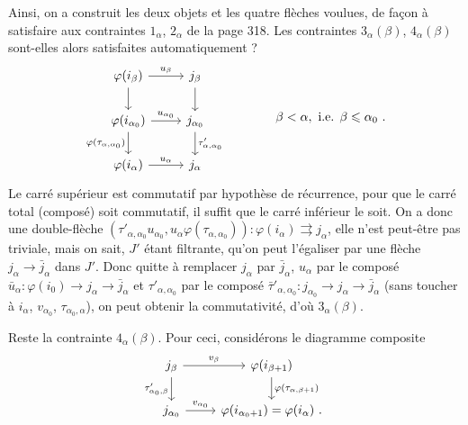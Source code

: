 \documentclass[11pt]{article}
\newcommand{\msp}[1]{\marginpar{\footnotesize [#1]}}
\begin{document}
Ainsi, on a construit les deux objets et les quatre flèches voulues, de façon à satisfaire aux contraintes $1_\alpha$, $2_\alpha$ de la page 318. Les contraintes $3_\alpha(\beta)$, $4_\alpha(\beta)$ sont-elles alors satisfaites automatiquement ?
\[
\begin{tikzcd}
\varphi(i_\beta) \arrow[r, "u_\beta"] \arrow[d] & j_\beta \arrow[d] \\
\varphi(i_{\alpha_0}) \arrow[r, "u_{\alpha_0}"] \arrow[d, "\varphi(\tau_{\alpha,\alpha_0})"'] & j_{\alpha_0} \arrow[d, "\tau'_{\alpha,\alpha_0}"] \\
\varphi(i_\alpha) \arrow[r, "u_\alpha"] & j_\alpha
\end{tikzcd}
\qquad\qquad \beta<\alpha, \text{ i.e. } \beta\leqslant\alpha_0\ .
\]
Le carré supérieur est commutatif par hypothèse de récurrence, pour que le carré total (composé) soit commutatif, il suffit que le carré inférieur le soit. On a donc une double-flèche $(\tau'_{\alpha,\alpha_0}u_{\alpha_0},u_\alpha\varphi(\tau_{\alpha,\alpha_0})):\varphi(i_\alpha)\rightrightarrows j_\alpha$, elle n'est peut-être pas triviale, mais on sait, $J'$ étant filtrante, qu'on peut l'égaliser par une flèche $j_\alpha\longrightarrow\bar{j}_\alpha$ dans $J'$. Donc quitte à remplacer $j_\alpha$ par %
\msp{page 324}
$\bar{j}_\alpha$, $u_\alpha$ par le composé $\bar{u}_\alpha:\varphi(i_0)\longrightarrow j_\alpha\longrightarrow\bar{j}_\alpha$ et $\tau'_{\alpha,\alpha_0}$ par le composé $\bar{\tau}'_{\alpha,\alpha_0}:j_{\alpha_0}\longrightarrow j_\alpha\longrightarrow\bar{j}_\alpha$ (sans toucher à $i_\alpha$, $v_{\alpha_0}$, $\tau_{\alpha_0,\alpha}$), on peut obtenir la commutativité, d'où $3_\alpha(\beta)$. %

Reste la contrainte $4_\alpha(\beta)$. Pour ceci, considérons le diagramme composite
\[
\begin{tikzcd}
j_\beta \arrow[r, "v_\beta"] \arrow[d, "\tau'_{\alpha_0,\beta}"'] & \varphi(i_{\beta+1}) \arrow[d, "\varphi(\tau_{\alpha,\beta+1})"] \\
j_{\alpha_0} \arrow[r, "v_{\alpha_0}"] & \varphi(i_{\alpha_0+1})=\varphi(i_\alpha)\ .
\end{tikzcd}
\]
\end{document}
